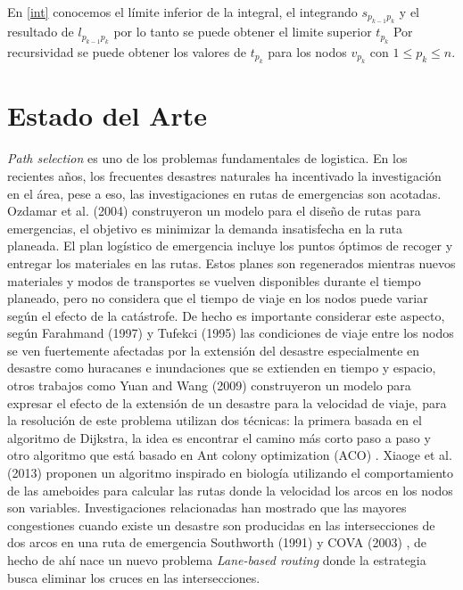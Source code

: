 \documentclass[letter, 10pt]{article}
\begin{document}
En \eqref{int} conocemos el límite inferior de la integral, el integrando $ s_{p_{k-1}p_k}$ y el resultado de $ l_{p_{k-1}p_k} $ por lo tanto se puede obtener el limite superior $t_{p_k}$
Por recursividad se puede obtener los valores de $t_{p_k}$ para los nodos $v_{p_k}$ con  $1\leq p_k \leq n$.




\section{Estado del Arte}

\textit{Path selection} es uno de los problemas fundamentales de logistica. En los recientes años, los frecuentes desastres naturales ha incentivado la investigación en el área, pese a eso, las investigaciones en rutas de emergencias son acotadas.  Ozdamar et al. (2004) \cite{ozdamar2004emergency} construyeron un modelo para el diseño de rutas para emergencias, el objetivo es minimizar la demanda insatisfecha en la ruta planeada. El plan logístico de emergencia incluye los puntos óptimos de recoger y entregar los materiales en las rutas. Estos planes son regenerados mientras nuevos materiales y modos de transportes se vuelven disponibles durante el tiempo planeado, pero no considera que el tiempo de viaje en los nodos puede variar según el efecto de la catástrofe. De hecho es importante considerar este aspecto, según Farahmand (1997) \cite{farahmand1997application} y Tufekci  (1995) \cite{tufekci1995integrated} las condiciones de viaje entre los nodos se ven fuertemente afectadas por la extensión del desastre especialmente en desastre como huracanes e inundaciones que se extienden en tiempo y espacio, otros trabajos como Yuan and Wang (2009) \cite{Yuan20091081} construyeron un modelo para expresar el efecto de la extensión de un desastre para la velocidad de viaje, para la resolución de este problema utilizan dos técnicas: la primera basada en el algoritmo de Dijkstra, la idea es encontrar el camino más corto paso a paso y otro algoritmo que está basado en Ant colony optimization (ACO) \cite{Yuan20091081}. Xiaoge et al. (2013) \cite{zhang2013route} proponen un algoritmo inspirado en biología utilizando el comportamiento de las ameboides para calcular las rutas donde la velocidad los arcos en los nodos son variables. Investigaciones relacionadas han mostrado que las mayores congestiones cuando existe un desastre son producidas en las intersecciones de dos arcos en una ruta de emergencia Southworth (1991) \cite{southworth1991regional} y COVA (2003) \cite{cova2003network}, de hecho de ahí nace un nuevo problema \textit{Lane-based routing} donde la estrategia busca eliminar los cruces en las intersecciones. \cite{cova2003network}
\end{document}
